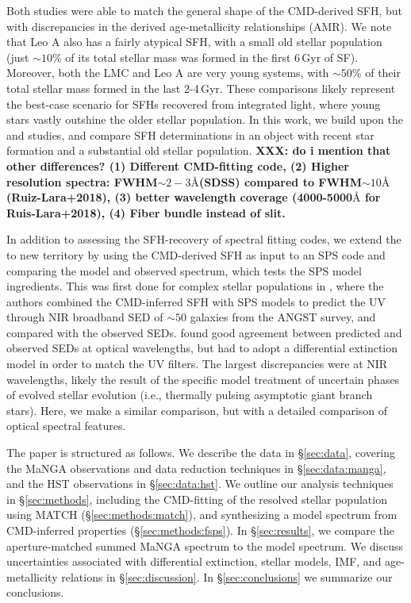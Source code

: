\documentclass[preprint2]{aastex62}
\newcommand{\ang}{\ensuremath{\mbox{\AA}}\xspace}
\newcommand{\Gyr}{$\,$Gyr\xspace}
\begin{document}
Both studies were able to match the general shape of the CMD-derived SFH, but with discrepancies in the derived age-metallicity relationships (AMR). We note that Leo A also has a fairly atypical SFH, with a small old stellar population (just $\sim10$\% of its total stellar mass was formed in the first 6\Gyr of SF). Moreover, both the LMC and Leo A are very young systems, with $\sim50$\% of their total stellar mass formed in the last 2-4\Gyr. These comparisons likely represent the best-case scenario for SFHs recovered from integrated light, where young stars vastly outshine the older stellar population. In this work, we build upon the \citet{Ruiz-Lara+2015} and \citet{Ruiz-Lara+2018} studies, and compare SFH determinations in an object with recent star formation and a substantial old stellar population. \textbf{XXX: do i mention that other differences? (1) Different CMD-fitting code, (2) Higher resolution spectra: FWHM$\sim2-3$\ang (SDSS) compared to FWHM$\sim10$\ang (Ruiz-Lara+2018), (3) better wavelength coverage (4000-5000\ang for Ruis-Lara+2018), (4) Fiber bundle instead of slit.}

In addition to assessing the SFH-recovery of spectral fitting codes, we extend the \citet{Ruiz-Lara+2018} to new territory by using the CMD-derived SFH as input to an SPS code and comparing the model and observed spectrum, which tests the SPS model ingredients. This was first done for complex stellar populations in \citet{Johnson+2013}, where the authors combined the CMD-inferred SFH with SPS models to predict the UV through NIR broadband SED of $\sim50$ galaxies from the ANGST survey, and compared with the observed SEDs. \citet{Johnson+2013} found good agreement between predicted and observed SEDs at optical wavelengths, but had to adopt a differential extinction model in order to match the UV filters. The largest discrepancies were at NIR wavelengths, likely the result of the specific model treatment of uncertain phases of evolved stellar evolution (i.e., thermally pulsing asymptotic giant branch stars). Here, we make a similar comparison, but with a detailed comparison of optical spectral features.

The paper is structured as follows. We describe the data in \S\ref{sec:data}, covering the MaNGA observations and data reduction techniques in \S\ref{sec:data:manga}, and the HST observations in \S\ref{sec:data:hst}. We outline our analysis techniques in \S\ref{sec:methods}, including the CMD-fitting of the resolved stellar population using MATCH (\S\ref{sec:methods:match}), and synthesizing a model spectrum from CMD-inferred properties (\S\ref{sec:methods:fsps}). In \S\ref{sec:results}, we compare the aperture-matched summed MaNGA spectrum to the model spectrum. We discuss uncertainties associated with differential extinction, stellar models, IMF, and age-metallicity relations in \S\ref{sec:discussion}. In \S\ref{sec:conclusions} we summarize our conclusions.
\end{document}
